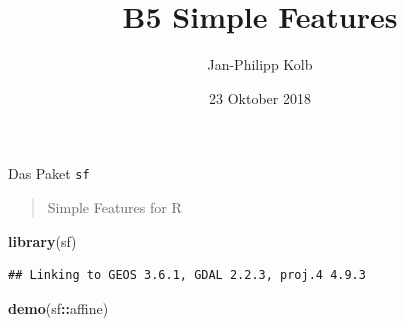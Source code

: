 \documentclass[ignorenonframetext,]{beamer}
\title{B5 Simple Features}
\author{Jan-Philipp Kolb}
\date{23 Oktober 2018}
\newenvironment{Shaded}{\begin{snugshade}}{\end{snugshade}}
\newcommand{\KeywordTok}[1]{\textcolor[rgb]{0.13,0.29,0.53}{\textbf{#1}}}
\newcommand{\OperatorTok}[1]{\textcolor[rgb]{0.81,0.36,0.00}{\textbf{#1}}}
\newcommand{\NormalTok}[1]{#1}
\begin{document}
\frame{\titlepage}

\begin{frame}[fragile]{Das Paket \texttt{sf}}

\begin{quote}
Simple Features for R
\end{quote}

\begin{Shaded}
\begin{Highlighting}[]
\KeywordTok{library}\NormalTok{(sf)}
\end{Highlighting}
\end{Shaded}

\begin{verbatim}
## Linking to GEOS 3.6.1, GDAL 2.2.3, proj.4 4.9.3
\end{verbatim}

\begin{Shaded}
\begin{Highlighting}[]
\KeywordTok{demo}\NormalTok{(sf}\OperatorTok{::}\NormalTok{affine)}
\end{Highlighting}
\end{Shaded}

\end{frame}
\end{document}
